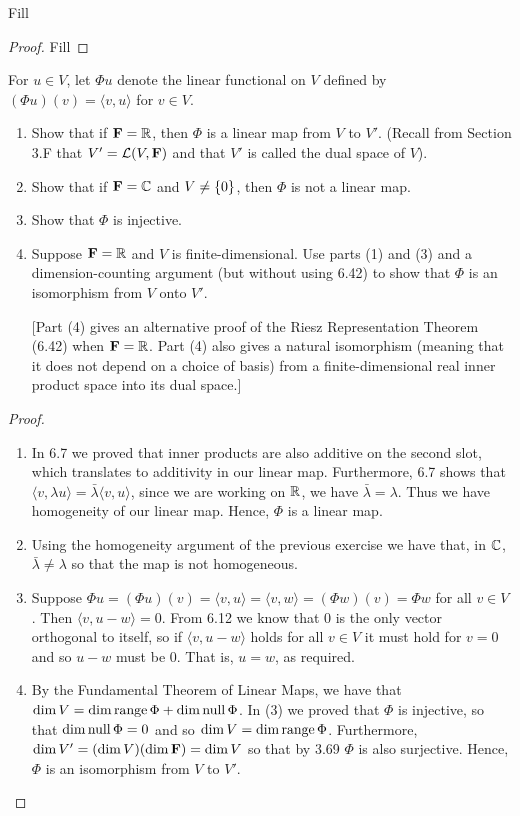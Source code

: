 \begin{exercise}{15}
  Fill
\end{exercise}
\begin{proof}
 Fill
\end{proof}

\begin{exercise}{17}
  For $u\in V$, let $\Phi u$ denote the linear functional on $V$ defined by $(\Phi u)(v)=\langle v,u\rangle$ for $v\in V$.
  \begin{enumerate}
      \item Show that if $\mathbf{F}=\mathbb{R}$, then $\Phi$ is a linear map from $V$ to $V'$. (Recall from Section 3.F that $V'=\mathcal{L}(V,\mathbf{F})$ and that $V'$ is called the dual space of $V$).
      \item Show that if $\mathbf{F}=\mathbb{C}$ and $V\neq\{0\}$, then $\Phi$ is not a linear map.
      \item Show that $\Phi$ is injective.
      \item Suppose $\mathbf{F}=\mathbb{R}$ and $V$ is finite-dimensional. Use parts (1) and (3) and a dimension-counting argument (but without using 6.42) to show that $\Phi$ is an isomorphism from $V$ onto $V'$.

      [Part (4) gives an alternative proof of the Riesz Representation Theorem (6.42) when $\mathbf{F}=\mathbb{R}$. Part (4) also gives a natural isomorphism (meaning that it does not depend on a choice of basis) from a finite-dimensional real inner product space into its dual space.]
  \end{enumerate}
\end{exercise}
\begin{proof}
 \begin{enumerate}
     \item In 6.7 we proved that inner products are also additive on the second slot, which translates to additivity in our linear map. Furthermore, 6.7 shows that $\langle v,\lambda u\rangle=\bar{\lambda}\langle v,u\rangle$, since we are working on $\mathbb{R}$, we have $\bar{\lambda}=\lambda$. Thus we have homogeneity of our linear map. Hence, $\Phi$ is a linear map.
     \item Using the homogeneity argument of the previous exercise we have that, in $\mathbb{C}$, $\bar{\lambda}\neq\lambda$ so that the map is not homogeneous.
     \item Suppose $\Phi u =(\Phi u)(v) =\langle v,u\rangle =\langle v,w\rangle =(\Phi w)(v) =\Phi w$ for all $v\in V$. Then $\langle v,u-w\rangle=0$. From 6.12 we know that 0 is the only vector orthogonal to itself, so if $\langle v,u-w\rangle$ holds for all $v\in V$ it must hold for $v=0$ and so $u-w$ must be 0. That is, $u=w$, as required.
     \item By the Fundamental Theorem of Linear Maps, we have that $\dim V =\dim\operatorname*{range}\Phi +\dim\operatorname*{null}\Phi$. In (3) we proved that $\Phi$ is injective, so that $\dim\operatorname*{null}\Phi=0$ and so $\dim V=\dim\operatorname*{range}\Phi$. Furthermore, $\dim V'=(\dim V)(\dim\mathbf{F})=\dim V$ so that by 3.69 $\Phi$ is also surjective. Hence, $\Phi$ is an isomorphism from $V$ to $V'$.
 \end{enumerate}
\end{proof}
